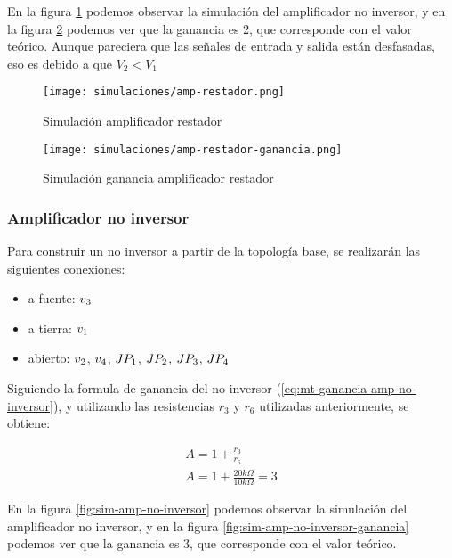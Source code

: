 En la figura \ref{fig:sim-amp-restador} podemos observar la simulación del amplificador no inversor, y en la figura \ref{fig:sim-amp-restador-ganancia} podemos ver que la ganancia es 2, que corresponde con el valor teórico. Aunque pareciera que las señales de entrada y salida están desfasadas, eso es debido a que $V_2 < V_1$

\begin{figure}[ht]
    \centering
    \texttt{[image: simulaciones/amp-restador.png]}
    \caption{Simulación amplificador restador}
    \label{fig:sim-amp-restador}
\end{figure}

\begin{figure}[ht]
    \centering
    \texttt{[image: simulaciones/amp-restador-ganancia.png]}
    \caption{Simulación ganancia amplificador restador}
    \label{fig:sim-amp-restador-ganancia}
\end{figure}


\FloatBarrier
\subsubsection{Amplificador no inversor}

Para construir un no inversor a partir de la topología base, se realizarán las siguientes conexiones:

\begin{itemize}
    \item a fuente: $\volt{3}$
    \item a tierra: $\volt{1}$
    \item abierto: $\volt{2}$, $\volt{4}$, $\jumper{1}$, $\jumper{2}$, $\jumper{3}$, $\jumper{4}$
\end{itemize}

Siguiendo la formula de ganancia del no inversor (\ref{eq:mt-ganancia-amp-no-inversor}), y utilizando las resistencias $r_3$ y $r_6$ utilizadas anteriormente, se obtiene:

\begin{align*}
    A = 1 + \frac{r_3}{r_6} \\
    A = 1 + \frac{20k\Omega}{10k\Omega} = 3
\end{align*}

En la figura \ref{fig:sim-amp-no-inversor} podemos observar la simulación del amplificador no inversor, y en la figura \ref{fig:sim-amp-no-inversor-ganancia} podemos ver que la ganancia es 3, que corresponde con el valor teórico.


